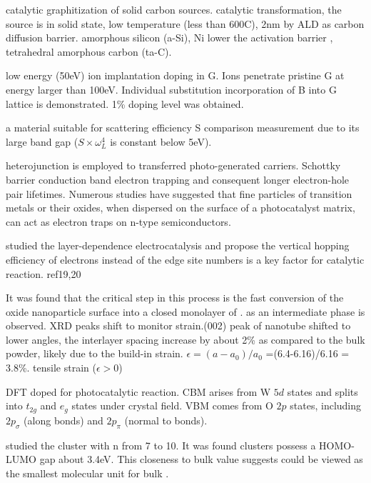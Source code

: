 catalytic graphitization of solid carbon sources. catalytic transformation, the source is in solid state, low temperature (less than 600C), 2nm   by ALD as carbon diffusion barrier. amorphous silicon (a-Si), Ni lower the activation barrier ,  tetrahedral amorphous carbon (ta-C).\cite{Weatherup2013}

low energy (50eV) ion implantation doping in G. Ions penetrate pristine G at energy larger than 100eV. Individual substitution incorporation of B into G lattice is demonstrated. 1\% doping level was obtained. \cite{Bangert2013}

 a material suitable for scattering efficiency S comparison measurement due to its large band gap ($S\times \omega_L^4$ is constant below 5eV).

heterojunction is employed to transferred photo-generated carriers. Schottky barrier conduction band electron trapping and consequent longer electron-hole pair lifetimes. Numerous studies have suggested that fine particles of transition metals or their oxides, when dispersed on the surface of a photocatalyst matrix, can act as electron traps on n-type semiconductors.\cite{Zhou2010} 

\citeauthor{Cao2014} studied the layer-dependence  electrocatalysis and propose the vertical hopping efficiency of electrons instead of the edge site numbers is a key factor for catalytic reaction.\cite{Cao2014} ref19,20

It was found that the critical step in this process is the fast conversion of the oxide nanoparticle surface into a closed monolayer of .  as an intermediate phase is observed. XRD peaks shift to monitor strain.(002) peak of nanotube shifted to lower angles, the interlayer spacing increase by about 2\% as compared to the bulk powder, likely due to the build-in strain.\cite{ZAK2009} 
$\epsilon = (a - a_0)/a_0$ =(6.4-6.16)/6.16 = 3.8\%. tensile strain ($\epsilon > 0$)


DFT doped  for photocatalytic reaction.\cite{Wang2012} CBM arises from W $5d$ states and splits into $t_{2g}$ and $e_g$ states under crystal field. VBM comes from O $2p$ states, including $2p_\sigma$ (along  bonds) and $2p_\pi$ (normal to  bonds).



\citeauthor{Huang2006} studied the  cluster with n from 7 to 10.\cite{Huang2006} It was found  clusters possess a HOMO-LUMO gap about 3.4eV. This closeness to bulk value suggests  could be viewed as the smallest molecular unit for bulk .

